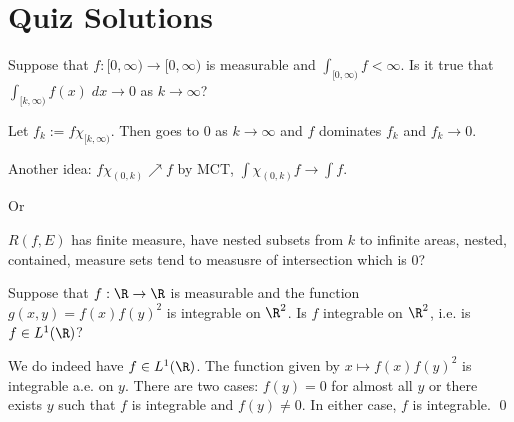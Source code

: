 \newpage
\section{Quiz Solutions}


























\begin{quizsol}
Suppose that $f: [0,\infty) \to [0,\infty)$ is measurable and $\int_{[0,\infty)} f < \infty$. Is it true that $\int_{[k,\infty)} f(x) \; dx \to 0$ as $k \to \infty$? 
\end{quizsol}

\pf Let $f_k:= f \chi_{[k,\infty)}$. Then goes to $0$ as $k \to \infty$ and $f$ dominates $f_k$ and $f_k \to 0$. 


Another idea: $f \chi_{(0,k)} \nearrow f$ by MCT, $\int \chi_{(0,k)} f \to \int f$. 


Or 

$R(f,E)$ has finite measure, have nested subsets from $k$ to infinite areas, nested, contained, measure sets tend to measusre of intersection which is 0? 













\begin{quizsol}
Suppose that $f: \R \to \R$ is measurable and the function $g(x,y)= f(x)f(y)^2$ is integrable on $\R^2$. Is $f$ integrable on $\R^2$, i.e. is $f \in L^1(\R)$?
\end{quizsol}

\pf We do indeed have $f \in L^1(\R)$. The function given by $x \mapsto f(x)f(y)^2$ is integrable a.e. on $y$. There are two cases: $f(y)=0$ for almost all $y$ or there exists $y$ such that $f$ is integrable and $f(y) \neq 0$. In either case, $f$ is integrable. \qed \\
















